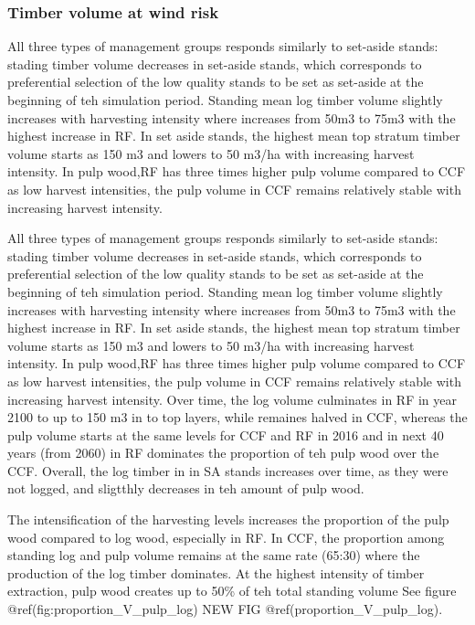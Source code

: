 \documentclass[]{elsarticle} %
\begin{document}
\subsubsection{Timber volume at wind
risk}\label{timber-volume-at-wind-risk}

All three types of management groups responds similarly to set-aside
stands: stading timber volume decreases in set-aside stands, which
corresponds to preferential selection of the low quality stands to be
set as set-aside at the beginning of teh simulation period. Standing
mean log timber volume slightly increases with harvesting intensity
where increases from 50m3 to 75m3 with the highest increase in RF. In
set aside stands, the highest mean top stratum timber volume starts as
150 m3 and lowers to 50 m3/ha with increasing harvest intensity. In pulp
wood,RF has three times higher pulp volume compared to CCF as low
harvest intensities, the pulp volume in CCF remains relatively stable
with increasing harvest intensity.

All three types of management groups responds similarly to set-aside
stands: stading timber volume decreases in set-aside stands, which
corresponds to preferential selection of the low quality stands to be
set as set-aside at the beginning of teh simulation period. Standing
mean log timber volume slightly increases with harvesting intensity
where increases from 50m3 to 75m3 with the highest increase in RF. In
set aside stands, the highest mean top stratum timber volume starts as
150 m3 and lowers to 50 m3/ha with increasing harvest intensity. In pulp
wood,RF has three times higher pulp volume compared to CCF as low
harvest intensities, the pulp volume in CCF remains relatively stable
with increasing harvest intensity. Over time, the log volume culminates
in RF in year 2100 to up to 150 m3 in to top layers, while remaines
halved in CCF, whereas the pulp volume starts at the same levels for CCF
and RF in 2016 and in next 40 years (from 2060) in RF dominates the
proportion of teh pulp wood over the CCF. Overall, the log timber in in
SA stands increases over time, as they were not logged, and sligtthly
decreases in teh amount of pulp wood.

The intensification of the harvesting levels increases the proportion of
the pulp wood compared to log wood, especially in RF. In CCF, the
proportion among standing log and pulp volume remains at the same rate
(65:30) where the production of the log timber dominates. At the highest
intensity of timber extraction, pulp wood creates up to 50\% of teh
total standing volume See figure @ref(fig:proportion\_V\_pulp\_log) NEW
FIG @ref(proportion\_V\_pulp\_log).
\end{document}
